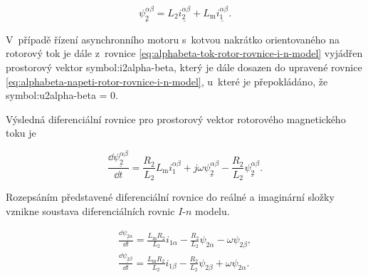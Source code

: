 \documentclass[a4paper, twoside, 11pt]{article}
\begin{document}
		\begin{equation}\label{eq:alphabeta-tok-rotor-rovnice-i-n-model}
			\underline{\psi_2^{\alpha \beta}} = L_2 \underline{i_2^{\alpha \beta}} + L_\text{m} \underline{i_1^{\alpha \beta}}.
		\end{equation}

		V~případě řízení asynchronního motoru s~kotvou nakrátko orientovaného na rotorový tok je dále z~rovnice \ref{eq:alphabeta-tok-rotor-rovnice-i-n-model} vyjádřen prostorový vektor \gls{symbol:i2alpha-beta}, který je dále dosazen do upravené rovnice \ref{eq:alphabeta-napeti-rotor-rovnice-i-n-model}, u~které je přepokládáno, že \gls{symbol:u2alpha-beta} = 0.\par
		Výsledná diferenciální rovnice pro prostorový vektor rotorového magnetického toku je

		\begin{equation}
			\frac{\dd{\underline{\psi_{2}^{\alpha \beta}}}}{\dd{t}} = \frac{R_2}{L_2}L_\text{m} i_1^{\alpha \beta} + j \omega \underline{\psi_2^{\alpha \beta}} - \frac{R_2}{L_2} \underline{\psi_2^{\alpha \beta}}.
		\end{equation}

		Rozepsáním představené diferenciální rovnice do reálné a imaginární složky vznikne soustava diferenciálních rovnic $I$-$n$ modelu.

		\begin{equation}\label{eq:i-n-model-psi-2-diff-for-rk-4}
			\begin{gathered}
				\frac{\dd{\underline{\psi_{2\alpha}}}}{\dd{t}} = \frac{L_\text{m} R_2}{L_2} i_{1\alpha} - \frac{R_2}{L_2} \psi_{2\alpha} - \omega \psi_{2\beta},\\\frac{\dd{\underline{\psi_{2\beta}}}}{\dd{t}} = \frac{L_\text{m} R_2}{L_2} i_{1\beta} - \frac{R_2}{L_2} \psi_{2\beta} + \omega \psi_{2\alpha}.
			\end{gathered}
		\end{equation}
\end{document}
